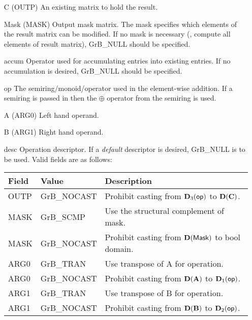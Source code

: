 \begin{itemize}[leftmargin=1.1in]
    \item[{\sf C}]     ({\sf OUTP}) An existing matrix to hold the result.

    \item[{\sf Mask}] ({\sf MASK}) Output mask matrix. The mask
    specifies which elements of the result matrix can be modified.
    If no mask is necessary (\ie, compute all elements of result
    matrix), {\sf GrB\_NULL} should be specified.

    \item[{\sf accum}]  Operator used for accumulating entries into existing
                         entries. If no accumulation is desired,
                        {\sf GrB\_NULL} should be specified.

    \item[{\sf op}]    The semiring/monoid/operator used in the element-wise addition.
                       If a semiring is passed in then the $\oplus$ operator from
                                    the semiring is used.
    \item[{\sf A}]     ({\sf ARG0}) Left hand operand.
    \item[{\sf B}]     ({\sf ARG1}) Right hand operand.
    
    \item[{\sf desc}]  Operation descriptor. If a
    \emph{default} descriptor is desired, {\sf GrB\_NULL} is to be
    used. Valid fields are as follows: \\
    \begin{tabular}{lll}
        Field  & Value & Description \\
        \hline
        {\sf OUTP} & {\sf GrB\_NOCAST} & Prohibit casting from $\bold{D}_3({\sf op})$ to $\bold{D}({\bf C})$. \\
        {\sf MASK} & {\sf GrB\_SCMP} & Use the structural complement of {\sf mask}. \\
    {\sf MASK} & {\sf GrB\_NOCAST} & Prohibit casting from $\bold{D}({\sf Mask})$ to {\sf bool} domain. \\
    {\sf ARG0} & {\sf GrB\_TRAN} & Use transpose of {\sf A} for operation. \\
        {\sf ARG0} & {\sf GrB\_NOCAST} & Prohibit casting from $\bold{D}({\bf A})$ to $\bold{D}_1({\sf op})$. \\
    {\sf ARG1} & {\sf GrB\_TRAN} & Use transpose of {\sf B} for operation. \\
        {\sf ARG1} & {\sf GrB\_NOCAST} & Prohibit casting from $\bold{D}({\bf B})$ to $\bold{D}_2({\sf op})$. \\
    \end{tabular}
\end{itemize}

